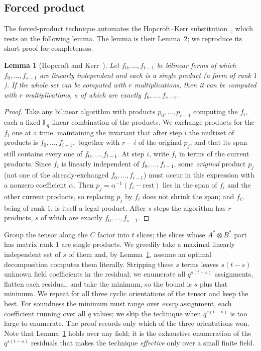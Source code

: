 \documentclass[11pt]{article}
\newtheorem{lemma}{Lemma}
\theoremstyle{definition}
\newcommand{\F}{\mathbb{F}}
\begin{document}
\subsection{Forced product}\label{sec:forced-product}

The forced-product technique automates the Hopcroft--Kerr
substitution~\cite{hopcroft1971minimizing}, which rests on the following lemma. The
lemma is their Lemma~2; we reproduce its short proof for completeness.

\begin{lemma}[Hopcroft and Kerr~\cite{hopcroft1971minimizing}]\label{lem:forced-product}
  Let $f_0,\dots,f_{t-1}$ be bilinear forms of which $f_0,\dots,f_{s-1}$ are linearly
  independent and each is a single product (a form of rank $1$). If the whole set can
  be computed with $r$ multiplications, then it can be computed with $r$
  multiplications, $s$ of which are exactly $f_0,\dots,f_{s-1}$.
\end{lemma}

\begin{proof}
  Take any bilinear algorithm with products $p_0,\dots,p_{r-1}$ computing the $f_i$,
  each a fixed $\F_q$-linear combination of the products. We exchange products for the
  $f_i$ one at a time, maintaining the invariant that after step $i$ the multiset of
  products is $f_0,\dots,f_{i-1},$ together with $r-i$ of the original $p_j$, and that
  its span still contains every one of $f_0,\dots,f_{t-1}$.
  At step $i$, write $f_i$ in terms of the current
  products. Since $f_i$ is linearly independent of $f_0,\dots,f_{i-1}$, some
  \emph{original} product $p_j$ (not one of the already-exchanged $f_0,\dots,f_{i-1}$)
  must occur in this expression with a nonzero coefficient $\alpha$. Then
  $p_j=\alpha^{-1}(f_i-\text{rest})$ lies in the span of $f_i$ and the other current
  products, so replacing $p_j$ by $f_i$ does not shrink the span; and $f_i$, being of
  rank $1$, is itself a legal product. After $s$ steps the algorithm has $r$ products,
  $s$ of which are exactly $f_0,\dots,f_{s-1}$.
\end{proof}

Group the tensor along the $C$ factor into $t$ slices; the slices whose
$A^*\otimes B^*$ part has matrix rank $1$ are single products. We greedily take a
maximal linearly independent set of $s$ of them and, by
Lemma~\ref{lem:forced-product}, assume an optimal decomposition computes them
literally. Stripping these $s$ terms leaves $s(t-s)$ unknown field coefficients in
the residual; we enumerate all $q^{s(t-s)}$ assignments, flatten each residual, and
take the minimum, so the bound is $s$ plus that minimum. We repeat for all three
cyclic orientations of the tensor and keep the best. For soundness the minimum must
range over \emph{every} assignment, each coefficient running over all $q$ values; we
skip the technique when $q^{s(t-s)}$ is too large to enumerate. The proof records only which of the three
orientations won. Note that Lemma~\ref{lem:forced-product} holds over any field; it
is the exhaustive enumeration of the $q^{s(t-s)}$ residuals that makes the technique
\emph{effective} only over a small finite field.
\end{document}
